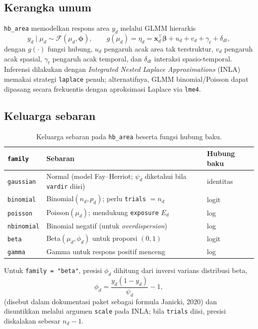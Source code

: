 \documentclass[11pt,a4paper]{article}
\theoremstyle{definition}
\begin{document}
\subsection{Kerangka umum}

\texttt{hb\_area} memodelkan respons area $y_d$ melalui GLMM hierarkis
\begin{equation}
  y_d \mid \mu_d \sim \mathcal{F}(\mu_d, \boldsymbol{\phi}), \qquad
  g(\mu_d) = \eta_d = \mathbf{x}_d^{\top}\boldsymbol{\beta}
             + u_d + v_d + \gamma_t + \delta_{dt},
  \label{eq:hb}
\end{equation}
dengan $g(\cdot)$ fungsi hubung, $u_d$ pengaruh acak area tak terstruktur,
$v_d$ pengaruh acak spasial, $\gamma_t$ pengaruh acak temporal, dan
$\delta_{dt}$ interaksi spasio-temporal. Inferensi dilakukan dengan
\emph{Integrated Nested Laplace Approximations} (INLA) \cite{rue2009} memakai
strategi \texttt{laplace} penuh; alternatifnya, GLMM binomial/Poisson dapat
dipasang secara frekuentis dengan aproksimasi Laplace via \texttt{lme4}.

\subsection{Keluarga sebaran}

\begin{table}[h]
\centering
\caption{Keluarga sebaran pada \texttt{hb\_area} beserta fungsi hubung baku.}
\label{tab:family}
\begin{tabular}{@{}lll@{}}
\toprule
\texttt{family} & Sebaran & Hubung baku \\
\midrule
\texttt{gaussian}   & Normal (model Fay--Herriot; $\psi_d$ diketahui bila \texttt{vardir} diisi) & identitas \\
\texttt{binomial}   & Binomial$(n_d, p_d)$; perlu \texttt{trials} $= n_d$ & logit \\
\texttt{poisson}    & Poisson$(\mu_d)$; mendukung \texttt{exposure} $E_d$ & log \\
\texttt{nbinomial}  & Binomial negatif (untuk \emph{overdispersion}) & log \\
\texttt{beta}       & Beta$(\mu_d, \phi_d)$ untuk proporsi $(0,1)$ & logit \\
\texttt{gamma}      & Gamma untuk respons positif menceng & log \\
\bottomrule
\end{tabular}
\end{table}

Untuk \texttt{family = "beta"}, presisi $\phi_d$ dihitung dari inversi varians
distribusi beta,
\begin{equation}
  \phi_d = \frac{y_d(1-y_d)}{\psi_d} - 1,
\end{equation}
(disebut dalam dokumentasi paket sebagai formula Janicki, 2020) dan disuntikkan
melalui argumen \texttt{scale} pada INLA; bila \texttt{trials} diisi, presisi
diskalakan sebesar $n_d - 1$.
\end{document}
